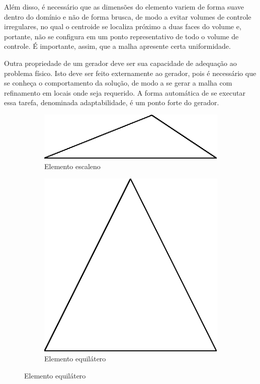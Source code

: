 Além disso, é necessário que as dimensões do elemento variem de forma suave dentro do domínio e não de forma brusca, de modo a evitar volumes de controle irregulares, no qual o centroide se localiza próximo a duas faces do volume e, portante, não se configura em um ponto representativo de todo o volume de controle. É importante, assim, que a malha apresente certa uniformidade.

Outra propriedade de um gerador deve ser sua capacidade de adequação ao problema físico. Isto deve ser feito externamente ao gerador, pois é necessário que se conheça o comportamento da solução, de modo a se gerar a malha com refinamento em locais onde seja requerido. A forma automática de se executar essa tarefa, denominada adaptabilidade, é um ponto forte do gerador.

\begin{figure}[ht]
    \begin{subfigure}{.5\textwidth}
        \centering
        \includegraphics[width=.8\linewidth]{fig/escaleno.eps}
        \caption{Elemento escaleno}
        \label{fig:sub-escaleno}
    \end{subfigure}
    \begin{subfigure}{.5\textwidth}
        \centering
        \includegraphics[width=.4\linewidth]{fig/equilatero.eps}
        \caption{Elemento equilátero}
        \label{fig:sub-second}
    \end{subfigure}


\end{figure}
